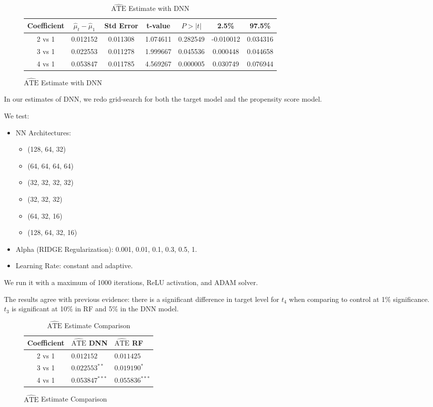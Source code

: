 \documentclass{article}
\begin{document}
\begin{figure}[H]
  \begin{table}[H]
  \centering
  \begin{tabular}{|ccccccc|}
    \hline
    Coefficient & $\hat{\mu}_t - \hat{\mu}_1$	& Std Error &	t-value	& $P>|t|$	& 2.5\%	& 97.5\% \\
    \hline
    2 vs 1	& 0.012152 & 0.011308	& 1.074611	& 0.282549 &	-0.010012 & 0.034316 \\
    3 vs 1	& 0.022553 & 0.011278	& 1.999667	& 0.045536 &	 0.000448 & 0.044658 \\
    4 vs 1	& 0.053847 & 0.011785	& 4.569267	& 0.000005 &	 0.030749 & 0.076944 \\
    \hline
  \end{tabular}
  \caption{$\hat{\text{ATE}}$ Estimate with DNN}
\end{table}
\end{figure}

In our estimates of DNN, we redo grid-search for both the target model and the propensity score model.

We test:
\begin{itemize}
  \item NN Architectures:
  \begin{itemize}
    \item (128, 64, 32)
    \item (64, 64, 64, 64)
    \item (32, 32, 32, 32)
    \item (32, 32, 32)
    \item (64, 32, 16)
    \item (128, 64, 32, 16)
  \end{itemize}
  \item Alpha (RIDGE Regularization): 0.001, 0.01, 0.1, 0.3, 0.5, 1.
  \item Learning Rate: constant and adaptive.
\end{itemize}

We run it with a maximum of 1000 iterations, ReLU activation, and ADAM solver.

The results agree with previous evidence: there is a significant difference in target level for $t_4$ when comparing to control at 1\% significance. $t_3$ is significant at 10\% in RF and 5\% in the DNN model.

\begin{figure}[H]
  \begin{table}[H]
  \centering
  \begin{tabular}{|cll|}
    \hline
    Coefficient & $\hat{\text{ATE}}$ DNN & $\hat{\text{ATE}}$ RF \\
    \hline
    2 vs 1	& $0.012152$ & $0.011425$ \\
    3 vs 1	& $0.022553^{**}$ & $0.019190^{*}$ \\
    4 vs 1	& $0.053847^{***}$ & $0.055836^{***}$ \\
    \hline
  \end{tabular}
  \caption{$\hat{\text{ATE}}$ Estimate Comparison}
\end{table}
\end{figure}
\end{document}
